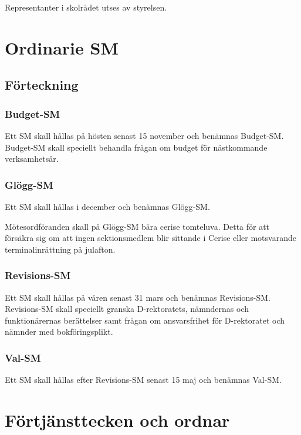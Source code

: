 \documentclass{dgovdoc}
\begin{document}
Representanter i skolrådet utses av styrelsen.

\section{Ordinarie SM}

\subsection{Förteckning}

\subsubsection{Budget-SM}

Ett SM skall hållas på hösten senast 15 november och benämnas Budget-SM.
Budget-SM skall speciellt behandla frågan om budget för nästkommande
verksamhetsår.

\subsubsection{Glögg-SM}

Ett SM skall hållas i december och benämnas Glögg-SM.

Mötesordföranden skall på Glögg-SM bära cerise tomteluva. Detta för att
försäkra sig om att ingen sektionsmedlem blir sittande i Cerise eller
motsvarande terminalinrättning på julafton.

\subsubsection{Revisions-SM}

Ett SM skall hållas på våren senast 31 mars och benämnas Revisions-SM.
Revisions-SM skall speciellt granska D-rektoratets, nämndernas och
funktionärernas berättelser samt frågan om ansvarsfrihet för D-rektoratet och
nämnder med bokföringsplikt.

\subsubsection{Val-SM}

Ett SM skall hållas efter Revisions-SM senast 15 maj och benämnas Val-SM.

\section{Förtjänsttecken och ordnar}
\end{document}
